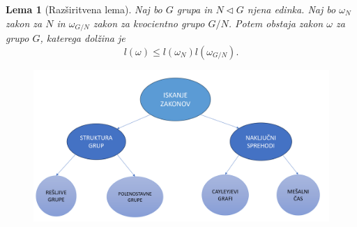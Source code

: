 \documentclass{beamer}
\newtheorem{lema}{Lema}
\newtheorem{pripomba}{Pripomba}
\begin{document}
\begin{frame}
    \begin{lema}[Razširitvena lema]
    Naj bo $G$ grupa in $N \triangleleft G$ njena edinka. Naj bo $\omega_N$ zakon za $N$ in
    $\omega_{G/N}$ zakon za kvocientno grupo $G/N$. Potem obstaja zakon $\omega$ za grupo $G$, katerega dolžina je \begin{equation*}
    l(\omega) \le  l(\omega_N)l(\omega_{G/N}).
    \end{equation*}  
      
    \end{lema}
    

      
    
\end{frame}

\begin{frame}
    \begin{figure}
        \centering
        \includegraphics[width=1.05\textwidth]{Miselni vzorec.png}
        \label{fig:miselni_vzorec}
    \end{figure}
\end{frame}
\end{document}
